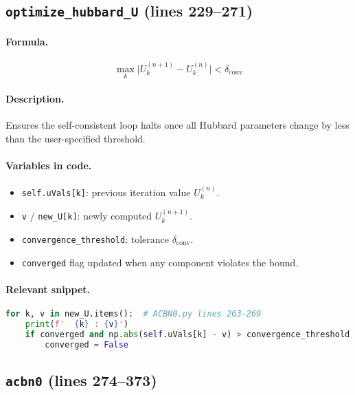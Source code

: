 \documentclass[11pt]{article}
\begin{document}
\subsection{\texttt{optimize\_hubbard\_U} (lines 229--271)}
\paragraph{Formula.}
\[\max_k \bigl|U^{(n+1)}_k - U^{(n)}_k\bigr| < \delta_{\text{conv}}\]
\paragraph{Description.}
Ensures the self-consistent loop halts once all Hubbard parameters change by less than the user-specified threshold.
\paragraph{Variables in code.}
\begin{itemize}[noitemsep]
  \item \verb|self.uVals[k]|: previous iteration value $U^{(n)}_k$.
  \item \verb|v| / \verb|new_U[k]|: newly computed $U^{(n+1)}_k$.
  \item \verb|convergence_threshold|: tolerance $\delta_{\text{conv}}$.
  \item \verb|converged| flag updated when any component violates the bound.
\end{itemize}
\paragraph{Relevant snippet.}
\begin{lstlisting}[language=python]
for k, v in new_U.items():  # ACBN0.py lines 263-269
    print(f'  {k} : {v}')
    if converged and np.abs(self.uVals[k] - v) > convergence_threshold:
        converged = False
\end{lstlisting}

\subsection{\texttt{acbn0} (lines 274--373)}
\end{document}
